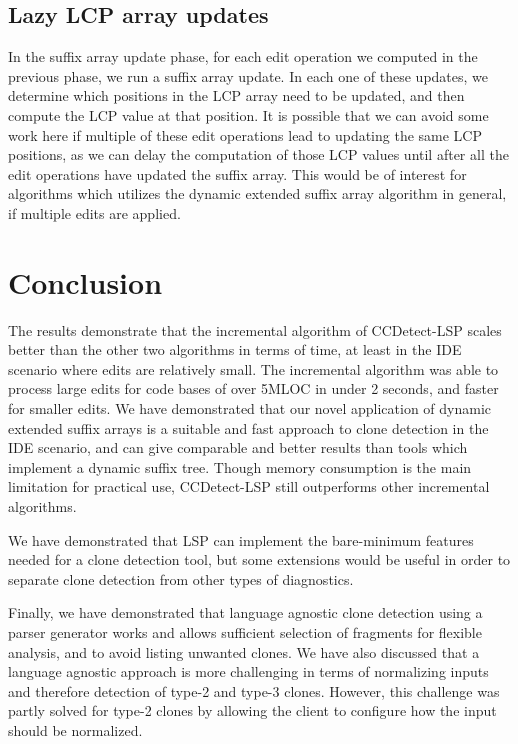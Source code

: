 \subsection*{Lazy LCP array updates}

In the suffix array update phase, for each edit operation we computed in the previous
phase, we run a suffix array update. In each one of these updates, we determine which
positions in the LCP array need to be updated, and then compute the LCP value at that
position. It is possible that we can avoid some work here if multiple of these edit
operations lead to updating the same LCP positions, as we can delay the computation of
those LCP values until after all the edit operations have updated the suffix array. This
would be of interest for algorithms which utilizes the dynamic extended suffix array
algorithm in general, if multiple edits are applied.

\section{Conclusion}

The results demonstrate that the incremental algorithm of CCDetect-LSP scales better than
the other two algorithms in terms of time, at least in the IDE scenario where edits are
relatively small. The incremental algorithm was able to process large edits for code bases
of over 5MLOC in under 2 seconds, and faster for smaller edits. We have demonstrated that
our novel application of dynamic extended suffix arrays is a suitable and fast approach to
clone detection in the IDE scenario, and can give comparable and better results than tools
which implement a dynamic suffix tree. Though memory consumption is the main limitation
for practical use, CCDetect-LSP still outperforms other incremental algorithms.

We have demonstrated that LSP can implement the bare-minimum features needed for a clone
detection tool, but some extensions would be useful in order to separate clone detection
from other types of diagnostics.

Finally, we have demonstrated that language agnostic clone detection using a parser
generator works and allows sufficient selection of fragments for flexible analysis, and to
avoid listing unwanted clones. We have also discussed that a language agnostic approach is
more challenging in terms of normalizing inputs and therefore detection of type-2 and
type-3 clones. However, this challenge was partly solved for type-2 clones by allowing the
client to configure how the input should be normalized.
